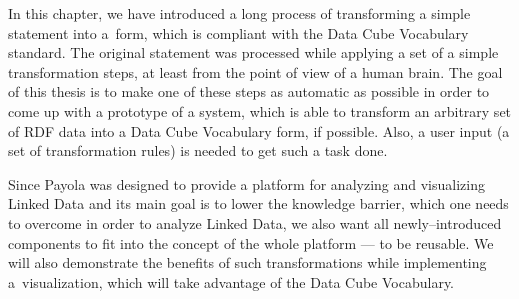 In this chapter, we have introduced a long process of transforming a simple statement into
a~form, which is compliant with the Data Cube Vocabulary standard. The original statement
was processed while applying a set of a simple transformation steps, at least from the point of view
of a human brain. The goal of this thesis is to make one of these steps as automatic as possible 
in order to come up with a prototype of a system, which is able to transform an arbitrary set of RDF data
into a Data Cube Vocabulary form, if possible. Also, a user input (a set of transformation rules) is
needed to get such a task done. 

Since Payola was designed to provide a platform for analyzing and visualizing 
Linked Data and its main goal is to lower the knowledge barrier, which one needs to 
overcome in order to analyze Linked Data, we also want all newly--introduced 
components to fit into the concept of the whole platform --- to be reusable. We 
will also demonstrate the benefits of such transformations while implementing 
a~visualization, which will take advantage of the Data Cube Vocabulary.